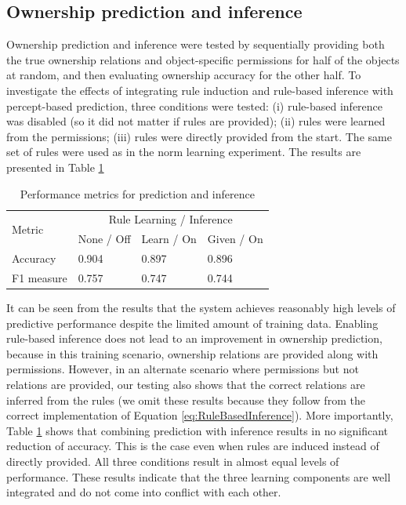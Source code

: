 \documentclass[letterpaper]{article} %
\begin{document}
\subsection{Ownership prediction and inference}

Ownership prediction and inference were tested by sequentially providing both the true ownership relations and object-specific permissions for half of the objects at random, and then evaluating ownership accuracy for the other half. To investigate the effects of integrating rule induction and rule-based inference with percept-based prediction, three conditions were tested: (i) rule-based inference was disabled (so it did not matter if rules are provided); (ii) rules were learned from the permissions; (iii) rules were directly provided from the start. The same set of rules were used as in the norm learning experiment. The results are presented in Table \ref{tab:OwnershipPrediction}

\begin{table}[ht]
\centering
\begin{tabular}{@{}llll@{}}
\toprule
\multirow{2}{*}{Metric} & \multicolumn{3}{c}{Rule Learning / Inference} \\ \cmidrule(l){2-4} 
                        & None / Off  & Learn / On & Given / On \\ \midrule
Accuracy                & 0.904       & 0.897      & 0.896      \\
F1 measure              & 0.757       & 0.747      & 0.744      \\ \bottomrule
\end{tabular}
\caption{Performance metrics for prediction and inference}
\label{tab:OwnershipPrediction}
\end{table}

It can be seen from the results that the system achieves reasonably high levels of predictive performance despite the limited amount of training data. Enabling rule-based inference does not lead to an improvement in ownership prediction, because in this training scenario, ownership relations are provided along with permissions. However, in an alternate scenario where permissions but not relations are provided, our testing also shows that the correct relations are inferred from the rules (we omit these results because they follow from the correct implementation of Equation \ref{eq:RuleBasedInference}). More importantly, Table \ref{tab:OwnershipPrediction} shows that combining prediction with inference results in no significant reduction of accuracy. This is the case even when rules are induced instead of directly provided. All three conditions result in almost equal levels of performance. These results indicate that the three learning components are well integrated and do not come into conflict with each other.
\end{document}
